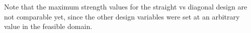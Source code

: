 Note that the maximum strength values for the straight vs diagonal design are not comparable yet, since the other design variables were set at an arbitrary value in the feasible domain.








